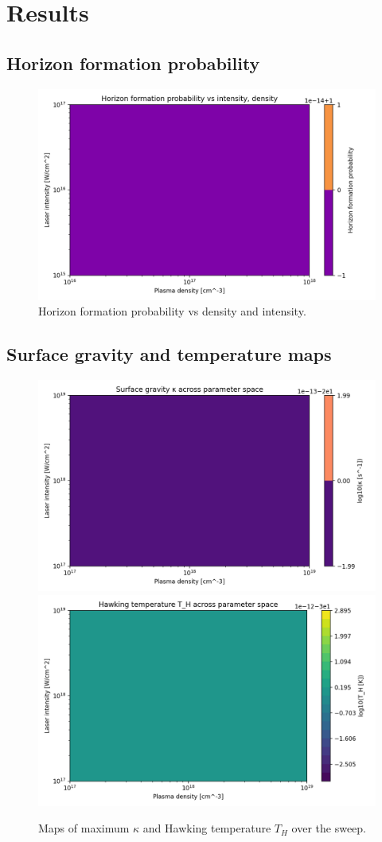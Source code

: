 \documentclass[11pt]{article}
\begin{document}
\section{Results}
\subsection{Horizon formation probability}
\begin{figure}[h]
  \centering
  \includegraphics[width=0.9\linewidth]{figures/horizon_analysis_probability_map.png}
  \caption{Horizon formation probability vs density and intensity.}
\end{figure}

\subsection{Surface gravity and temperature maps}
\begin{figure}[h]
  \centering
  \includegraphics[width=0.48\linewidth]{figures/horizon_analysis_kappa_map.png}\hfill
  \includegraphics[width=0.48\linewidth]{figures/horizon_analysis_TH_map.png}
  \caption{Maps of maximum $\kappa$ and Hawking temperature $T_H$ over the sweep.}
\end{figure}
\end{document}
